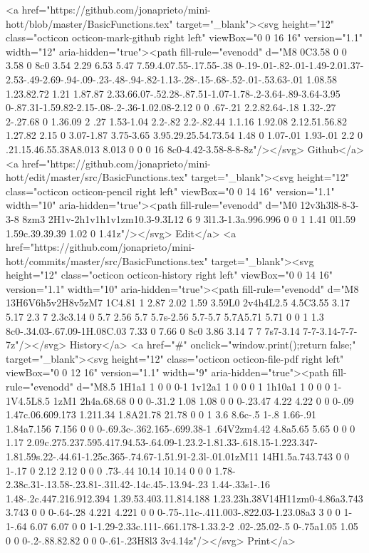 {      <a href="https://github.com/jonaprieto/mini-hott/blob/master/BasicFunctions.tex" target="_blank"><svg height="12" class="octicon octicon-mark-github right left" viewBox="0 0 16 16" version="1.1" width="12" aria-hidden="true"><path fill-rule="evenodd" d="M8 0C3.58 0 0 3.58 0 8c0 3.54 2.29 6.53 5.47 7.59.4.07.55-.17.55-.38 0-.19-.01-.82-.01-1.49-2.01.37-2.53-.49-2.69-.94-.09-.23-.48-.94-.82-1.13-.28-.15-.68-.52-.01-.53.63-.01 1.08.58 1.23.82.72 1.21 1.87.87 2.33.66.07-.52.28-.87.51-1.07-1.78-.2-3.64-.89-3.64-3.95 0-.87.31-1.59.82-2.15-.08-.2-.36-1.02.08-2.12 0 0 .67-.21 2.2.82.64-.18 1.32-.27 2-.27.68 0 1.36.09 2 .27 1.53-1.04 2.2-.82 2.2-.82.44 1.1.16 1.92.08 2.12.51.56.82 1.27.82 2.15 0 3.07-1.87 3.75-3.65 3.95.29.25.54.73.54 1.48 0 1.07-.01 1.93-.01 2.2 0 .21.15.46.55.38A8.013 8.013 0 0 0 16 8c0-4.42-3.58-8-8-8z"/></svg> Github</a>
      <a href="https://github.com/jonaprieto/mini-hott/edit/master/src/BasicFunctions.tex" target="_blank"><svg height="12" class="octicon octicon-pencil right left" viewBox="0 0 14 16" version="1.1" width="10" aria-hidden="true"><path fill-rule="evenodd" d="M0 12v3h3l8-8-3-3-8 8zm3 2H1v-2h1v1h1v1zm10.3-9.3L12 6 9 3l1.3-1.3a.996.996 0 0 1 1.41 0l1.59 1.59c.39.39.39 1.02 0 1.41z"/></svg> Edit</a>
      <a href="https://github.com/jonaprieto/mini-hott/commits/master/src/BasicFunctions.tex" target="_blank"><svg height="12" class="octicon octicon-history right left" viewBox="0 0 14 16" version="1.1" width="10" aria-hidden="true"><path fill-rule="evenodd" d="M8 13H6V6h5v2H8v5zM7 1C4.81 1 2.87 2.02 1.59 3.59L0 2v4h4L2.5 4.5C3.55 3.17 5.17 2.3 7 2.3c3.14 0 5.7 2.56 5.7 5.7s-2.56 5.7-5.7 5.7A5.71 5.71 0 0 1 1.3 8c0-.34.03-.67.09-1H.08C.03 7.33 0 7.66 0 8c0 3.86 3.14 7 7 7s7-3.14 7-7-3.14-7-7-7z"/></svg> History</a>
      <a  href="#" onclick="window.print();return false;" target="_blank"><svg height="12" class="octicon octicon-file-pdf right left" viewBox="0 0 12 16" version="1.1" width="9" aria-hidden="true"><path fill-rule="evenodd" d="M8.5 1H1a1 1 0 0 0-1 1v12a1 1 0 0 0 1 1h10a1 1 0 0 0 1-1V4.5L8.5 1zM1 2h4a.68.68 0 0 0-.31.2 1.08 1.08 0 0 0-.23.47 4.22 4.22 0 0 0-.09 1.47c.06.609.173 1.211.34 1.8A21.78 21.78 0 0 1 3.6 8.6c-.5 1-.8 1.66-.91 1.84a7.156 7.156 0 0 0-.69.3c-.362.165-.699.38-1 .64V2zm4.42 4.8a5.65 5.65 0 0 0 1.17 2.09c.275.237.595.417.94.53-.64.09-1.23.2-1.81.33-.618.15-1.223.347-1.81.59s.22-.44.61-1.25c.365-.74.67-1.51.91-2.3l-.01.01zM11 14H1.5a.743.743 0 0 1-.17 0 2.12 2.12 0 0 0 .73-.44 10.14 10.14 0 0 0 1.78-2.38c.31-.13.58-.23.81-.31l.42-.14c.45-.13.94-.23 1.44-.33s1-.16 1.48-.2c.447.216.912.394 1.39.53.403.11.814.188 1.23.23h.38V14H11zm0-4.86a3.743 3.743 0 0 0-.64-.28 4.221 4.221 0 0 0-.75-.11c-.411.003-.822.03-1.23.08a3 3 0 0 1-1-.64 6.07 6.07 0 0 1-1.29-2.33c.111-.661.178-1.33.2-2 .02-.25.02-.5 0-.75a1.05 1.05 0 0 0-.2-.88.82.82 0 0 0-.61-.23H8l3 3v4.14z"/></svg> Print</a>
}
